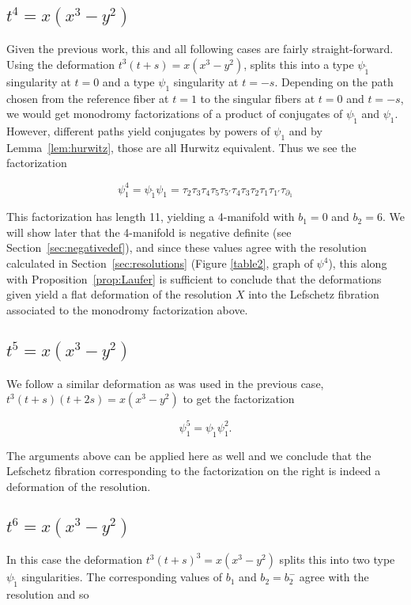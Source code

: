 \documentclass[11pt,letterpaper,reqno]{amsart}
\theoremstyle{remark}
\begin{document}
\subsection{\texorpdfstring{{\boldmath $t^4 = x(x^3-y^2)$}}{psi4}}
\label{sec:psi4}

Given the previous work, this and all following cases are fairly straight-forward. Using the deformation $t^3(t+s) = x(x^3-y^2)$, splits this into a type $\psi_{\tilde{1}}$ singularity at $t=0$ and a type $\psi_1$ singularity at $t=-s$. Depending on the path chosen from the reference fiber at $t=1$ to the singular fibers at $t=0$ and $t=-s$, we would get monodromy factorizations of a product of conjugates of $\psi_{\tilde{1}}$ and $\psi_1$. However, different paths yield conjugates by powers of $\psi_1$ and by Lemma~\ref{lem:hurwitz}, those are all Hurwitz equivalent. Thus we see the factorization

\[\psi_1^4 = \psi_{\tilde{1}} \psi_{{1}} = \tau_2 \tau_3 \tau_4 \tau_5 \tau_{5'} \tau_4 \tau_3 \tau_2\tau_1\tau_{1'} \tau_{\partial_1}\]

This factorization has length 11, yielding a 4-manifold with $b_1 =0$ and $b_2 = 6$. We will show later that the 4-manifold is negative definite (see Section~\ref{sec:negativedef}), and since these values agree with the resolution calculated in Section~\ref{sec:resolutions} (Figure \ref{table2}, graph of $\psi^4$), this along with Proposition~\ref{prop:Laufer} is sufficient to conclude that the deformations given yield a flat deformation of the resolution $X$ into the Lefschetz fibration associated to the monodromy factorization above.



\subsection{\texorpdfstring{{\boldmath $t^5= x(x^3-y^2)$}}{psi5}}
\label{sec:psi5}
We follow a similar deformation as was used in the previous case, $t^3(t+s)(t+2s) = x(x^3-y^2)$ to get the factorization

\[\psi_1^5 = \psi_{\tilde{1}} \psi_{{1}}^2.\]

The arguments above can be applied here as well and we conclude that the Lefschetz fibration corresponding to the factorization on the right is indeed a deformation of the resolution. 


\subsection{\texorpdfstring{{\boldmath $t^6= x(x^3-y^2)$}}{psi6}}
\label{sec:psi6}
In this case the deformation $t^3(t+s)^3 = x(x^3-y^2)$ splits this into two type $\psi_{\tilde{1}}$ singularities. The corresponding values of $b_1$ and $b_2 = b_2^-$ agree with the resolution and so 
\end{document}
